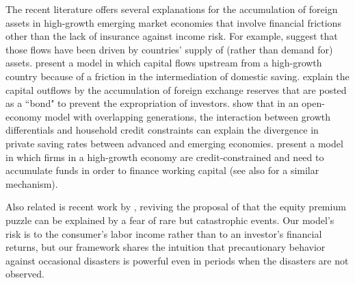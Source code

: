 \documentclass[titlepage,abstract,letterpaper]{econtex}
\begin{document}
The recent literature offers several explanations for the accumulation of foreign assets in high-growth emerging market economies that involve financial frictions other than the lack of insurance against income risk.
For example, \cite{cfg:globimbalances} suggest that those flows have been driven by countries' supply of (rather than  demand for) assets. \cite{SongStorenslettenZilibotti11} present a model in which capital flows upstream from a high-growth country because of a friction in the intermediation of domestic saving.
\cite{AguiarAmador11} explain the capital outflows by the accumulation of foreign exchange reserves that are posted as a
  ``bond" to prevent the expropriation of investors.
\cite{CoeurdacierGuibaudJin2015} show that in an open-economy model with overlapping generations, the interaction between growth differentials and household credit constraints can explain the divergence in private saving rates between advanced and emerging economies.
\cite{BachettaBenhima2015} present a model in which firms in a high-growth economy are credit-constrained and need to accumulate funds in order to finance working capital (see also 
\cite{BueraShin2009} for a similar mechanism).  

Also related is recent work by \cite{barroDisasters}, reviving the
proposal of \cite{reitzDisasters} that the equity premium puzzle can
be explained by a fear of rare but catastrophic events.  Our model's
risk is to the consumer's labor income rather than to an investor's
financial returns, but our framework shares the intuition that
precautionary behavior against occasional disasters is powerful even
in periods when the disasters are not observed. 
\end{document}
